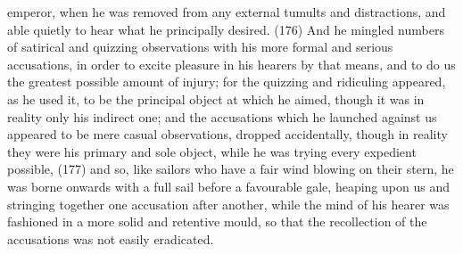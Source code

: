emperor, when he was removed from any external tumults and distractions, and able quietly to hear
what he principally desired. (176) And he mingled numbers of satirical and quizzing observations
with his more formal and serious accusations, in order to excite pleasure in his hearers by that
means, and to do us the greatest possible amount of injury; for the quizzing and ridiculing
appeared, as he used it, to be the principal object at which he aimed, though it was in reality only
his indirect one; and the accusations which he launched against us appeared to be mere casual
observations, dropped accidentally, though in reality they were his primary and sole object, while he
was trying every expedient possible, (177) and so, like sailors who have a fair wind blowing on their
stern, he was borne onwards with a full sail before a favourable gale, heaping upon us and
stringing together one accusation after another, while the mind of his hearer was fashioned in a
more solid and retentive mould, so that the recollection of the accusations was not easily
eradicated.

